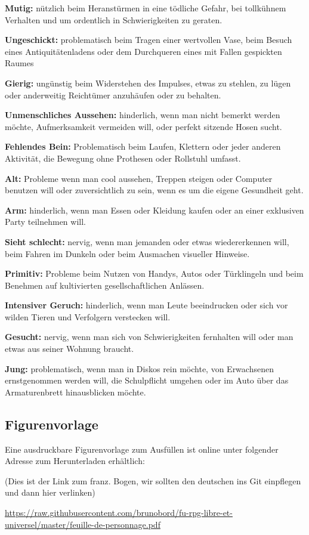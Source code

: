 \documentclass[]{article}
\begin{document}
\textbf{Mutig:} nützlich beim Heranstürmen in eine tödliche Gefahr, bei
tollkühnem Verhalten und um ordentlich in Schwierigkeiten zu geraten.

\textbf{Ungeschickt:} problematisch beim Tragen einer wertvollen Vase,
beim Besuch eines Antiquitätenladens oder dem Durchqueren eines mit
Fallen gespickten Raumes

\textbf{Gierig:} ungünstig beim Widerstehen des Impulses, etwas zu
stehlen, zu lügen oder anderweitig Reichtümer anzuhäufen oder zu
behalten.

\textbf{Unmenschliches Aussehen:} hinderlich, wenn man nicht bemerkt
werden möchte, Aufmerksamkeit vermeiden will, oder perfekt sitzende
Hosen sucht.

\textbf{Fehlendes Bein:} Problematisch beim Laufen, Klettern oder jeder
anderen Aktivität, die Bewegung ohne Prothesen oder Rollstuhl umfasst.

\textbf{Alt:} Probleme wenn man cool aussehen, Treppen steigen oder
Computer benutzen will oder zuversichtlich zu sein, wenn es um die
eigene Gesundheit geht.

\textbf{Arm:} hinderlich, wenn man Essen oder Kleidung kaufen oder an
einer exklusiven Party teilnehmen will.

\textbf{Sieht schlecht:} nervig, wenn man jemanden oder etwas
wiedererkennen will, beim Fahren im Dunkeln oder beim Ausmachen
visueller Hinweise.

\textbf{Primitiv:} Probleme beim Nutzen von Handys, Autos oder
Türklingeln und beim Benehmen auf kultivierten gesellschaftlichen
Anlässen.

\textbf{Intensiver Geruch:} hinderlich, wenn man Leute beeindrucken oder
sich vor wilden Tieren und Verfolgern verstecken will.

\textbf{Gesucht:} nervig, wenn man sich von Schwierigkeiten fernhalten
will oder man etwas aus seiner Wohnung braucht.

\textbf{Jung:} problematisch, wenn man in Diskos rein möchte, von
Erwachsenen ernstgenommen werden will, die Schulpflicht umgehen oder im
Auto über das Armaturenbrett hinausblicken möchte.

\subsection{Figurenvorlage}\label{figurenvorlage}

Eine ausdruckbare Figurenvorlage zum Ausfüllen ist online unter
folgender Adresse zum Herunterladen erhältlich:

(Dies ist der Link zum franz. Bogen, wir sollten den deutschen ins Git
einpflegen und dann hier verlinken)

\url{https://raw.githubusercontent.com/brunobord/fu-rpg-libre-et-universel/master/feuille-de-personnage.pdf}
\end{document}
